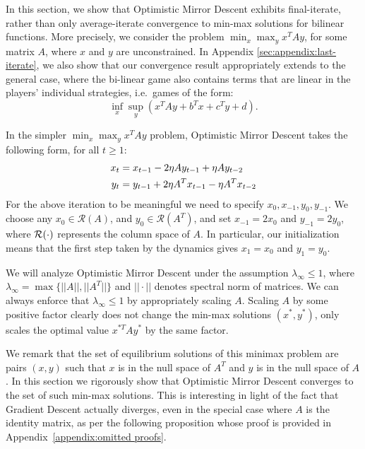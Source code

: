 \label{sec:main:proof OMD converges}
In this section, we show that Optimistic Mirror Descent  
exhibits final-iterate, rather than only average-iterate convergence to min-max solutions for
bilinear functions. 
More precisely, we consider the problem $\min_x \max_y x^T A y$, for some matrix $A$, where $x$ and $y$ are unconstrained. In Appendix \ref{sec:appendix:last-iterate}, we also show that our convergence result appropriately extends to the general case, where the bi-linear game
also contains terms that are linear in the players' individual strategies, i.e.~games of the form:
\begin{equation}
    \inf_{x} \sup_{y} \left(x^TAy + b^Tx + c^Ty + d\right). \label{eq:inf sup problem general}
\end{equation}

In the simpler $\min_{x}\max_{y} x^T Ay$ problem, Optimistic Mirror Descent takes the following form, for all $t \ge 1$:
\begin{align}
    x_{t} &= {}x_{t{-1}} - 2\eta{}Ay_{t{-1}} + \eta{}Ay_{t{-2}} \label{eq:OGD bilinear x repeat}\\
    y_{t} &= {}y_{t{-1}} + 2\eta{}A^Tx_{t{-1}} - \eta{}A^Tx_{t{-2}}  \label{eq:OGD bilinear y repeat}
\end{align}
 For the above iteration to be meaningful we need to specify $x_0,x_{-1},y_0,y_{-1}$. We choose any $x_0 \in
\mathcal{R}(A)$, and $y_0\in\mathcal{R}(A^T)$, and set $x_{-1}=2x_0$ and $y_{-1}=2y_{0}$, where ${\cal R}(\cdot)$ represents the column space of $A$. In particular, our initialization means that the first step taken by the dynamics gives $x_1=x_0$ and $y_1=y_0$.

\smallskip We will analyze Optimistic Mirror Descent under the assumption $\lambda_{\infty} \le 1$, where $\lambda_{\infty}=\max\{||A||,||A^T||\}$ and $||\cdot||$ denotes spectral norm of matrices. We can always enforce that $\lambda_{\infty} \le 1$ by appropriately scaling $A$. Scaling $A$ by some positive factor clearly does not change the min-max solutions $(x^*,y^*)$, only scales the optimal value $x^{*T}Ay^*$ by the same factor.

We remark that the set of equilibrium solutions of this minimax problem  are pairs $(x,y)$ such that $x$ is in the null space of $A^T$ and $y$ is in the null space of $A$. 
In this section we rigorously show that Optimistic Mirror Descent converges to the set of such min-max solutions. This is interesting in light of the fact that Gradient Descent actually diverges, even in the special case where $A$ is the identity matrix, as per the following proposition whose proof is provided in Appendix~\ref{appendix:omitted proofs}.


